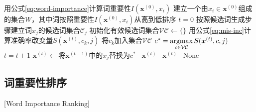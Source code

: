 \begin{algorithm}[!h]
    \wuhao
	\LinesNumbered %
		{
		    用公式\ref{eq:word-importance}计算词重要性$I(\bm{x}^{(0)},x_i)$\;
		}
		建立一个由$x_i\in\bm{x}^{(0)}$组成的集合$W$，其中词按照重要性$I(\bm{x}^{(0)},x_i)$从高到低排序\;
		$t=0$\;
		{
		    按照候选词生成步骤建立词$x_j$的候选词集合$\mathcal{C}_j$\;
		    初始化有效候选词集合$\mathcal{VC} \leftarrow \{\}$\;
		    {
		        用公式\ref{eq:mis-inc}计算准确率改变量$S(\bm{x}^{(t)},c_k,j)$\;
		        {
		            将$c_k$加入集合$\mathcal{VC}$
		        }
		    }
		}
		{
		    $c^* = \operatorname*{argmax}\limits_{c \in \mathcal{VC}} S(\bm{x}^{(t)},c,j)$\;
    		$t = t + 1$\;
    		$\bm{x}^{(t)} \leftarrow \text{将} \bm{x}^{(t-1)} \text{中的} x_j  \text{替换为} c^*$\;
    		{
    		    \algorithmicreturn\ $\bm{x}^{(t)}$
    		}
		}
		{
		    \algorithmicreturn\ $\bm{x}^{(t)}$
		}
		{
		    \algorithmicreturn\ None
		}
	\label{algo:attack}
\end{algorithm}


\subsection{词重要性排序}[Word Importance Ranking]

